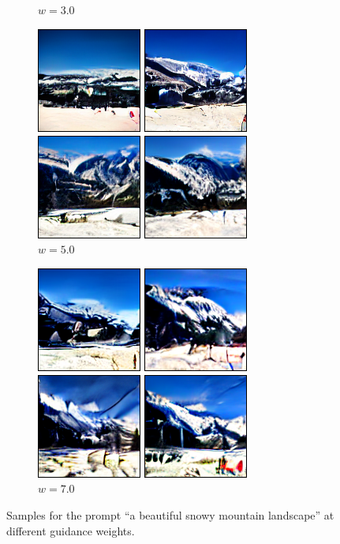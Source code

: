 \documentclass[11pt,a4paper]{article}
\begin{document}
\begin{figure}[!ht]
\begin{subfigure}[b]{0.24\textwidth}
\caption{$w=3.0$}
\end{subfigure}
\begin{subfigure}[b]{0.24\textwidth}
\includegraphics[width=\linewidth]{figures/a_beautiful_snowy_mountain_landscape_5.png}
\caption{$w=5.0$}
\end{subfigure}
\begin{subfigure}[b]{0.24\textwidth}
\includegraphics[width=\linewidth]{figures/a_beautiful_snowy_mountain_landscape_7.png}
\caption{$w=7.0$}
\end{subfigure}
\caption{Samples for the prompt ``a beautiful snowy mountain landscape'' at different guidance weights.}
\end{figure}
\end{document}
